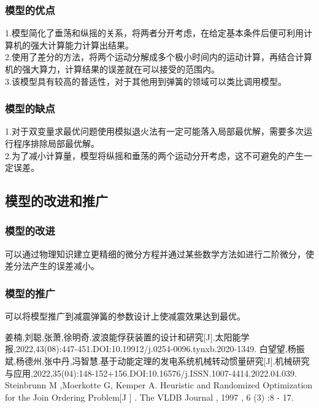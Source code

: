 \documentclass[a4paper,12pt]{article}
\begin{document}
	\subsubsection{模型的优点}
    \noindent 1.模型简化了垂荡和纵摇的关系，将两者分开考虑，在给定基本条件后便可利用计算机的强大计算能力计算出结果。\\
	2.使用了差分的方法，将两个运动分解成多个极小时间内的运动计算，再结合计算机的强大算力，计算结果的误差就在可以接受的范围内。\\
	3.该模型具有较高的普适性，对于其他用到弹簧的领域可以类比调用模型。
	\subsubsection{模型的缺点}
	\noindent 1.对于双变量求最优问题使用模拟退火法有一定可能落入局部最优解，需要多次运行程序排除局部最优解。\\
	2.为了减小计算量，模型将纵摇和垂荡的两个运动分开考虑，这不可避免的产生一定误差。
	\subsection{模型的改进和推广}
	\subsubsection{模型的改进}
	可以通过物理知识建立更精细的微分方程并通过某些数学方法如进行二阶微分，使差分法产生的误差减小。
	\subsubsection{模型的推广}
	可以将模型推广到减震弹簧的参数设计上使减震效果达到最优。
	\begin{thebibliography}{10}
		姜楠,刘聪,张萧,徐明奇.波浪能俘获装置的设计和研究[J].太阳能学报,2022,43(08):447-451.DOI:10.19912/j.0254-0096.tynxb.2020-1349.
		白望望,杨振斌,杨德州,张中丹,冯智慧.基于动能定理的发电系统机械转动惯量研究[J].机械研究与应用,2022,35(04):148-152+156.DOI:10.16576/j.ISSN.1007-4414.2022.04.039.
		Steinbrunn M ,Moerkotte G, Kemper A. Heuristic and Randomized Optimization for the Join Ordering Problem[J ] . The VLDB Journal , 1997 , 6 (3) :8 - 17.
	\end{thebibliography}
	\newpage
\end{document}
